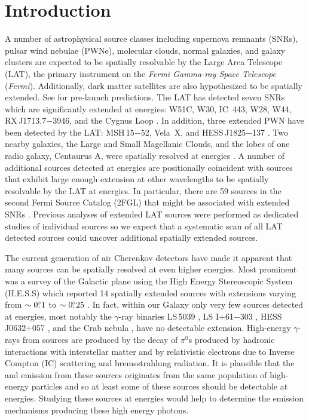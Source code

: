 \documentclass[12pt,preprint]{aastex}
\newcommand{\gev}{\text{GeV}\xspace}
\newcommand{\tev}{\text{TeV}\xspace}
\newcommand{\fermi}{\textit{Fermi}\xspace}
\begin{document}
\section{Introduction}

A number of astrophysical source classes including supernova remnants
(SNRs), pulsar wind nebulae (PWNe), molecular clouds, normal galaxies,
and galaxy clusters are expected to be spatially resolvable 
by the Large Area Telescope (LAT), the primary instrument on the {\em \fermi
Gamma-ray Space Telescope} (\fermi).
Additionally, dark matter satellites are also hypothesized to
be spatially extended. See \cite{atwood_fermi} for pre-launch predictions.
The LAT has
detected seven SNRs which are significantly extended
at \gev energies: 
W51C, W30, 
IC~443, W28, W44, RX\,J1713.7$-$3946,
and the Cygnus Loop
\citep{w51c,w30_lat,ic443,w28,w44,rx_j1713_lat,cygnus_loop_lat}. In addition, 
three extended PWN have been detected by the LAT: MSH\,15$-$52, Vela~X, and
HESS\,J1825$-$137 \citep{msh1552,velax,fermi_hess_j1825}. Two
nearby galaxies, the Large and Small Magellanic Clouds, 
and the lobes of one
radio galaxy, Centaurus A, were spatially resolved at \gev energies
\citep{lmc,smc,cen_a_lat}.  A number of additional sources detected
at \gev energies are positionally coincident with sources that exhibit
large enough extension at other wavelengths to be spatially
resolvable by the LAT at \gev energies.
In particular, there are 59 \gev sources in the second Fermi Source Catalog (2FGL)
that might be associated with extended SNRs \citep[2FGL][]{second_cat}.
Previous analyses of extended LAT sources were performed as dedicated
studies of individual sources so we expect that a systematic scan of
all LAT detected sources could uncover additional spatially extended
sources. 

The current generation of air Cherenkov detectors have
made it apparent that many sources can be spatially resolved
at even higher energies.
Most
prominent was a survey of the Galactic plane using the High Energy
Stereoscopic System (H.E.S.S) which reported 14 spatially extended
sources with extensions varying from $\sim0\mbox{$.\!\!^\circ$}1$ to $\sim0\mbox{$.\!\!^\circ$}25$
\citep{hess_plane_survey}.  In fact, within our Galaxy only very few
sources detected at \tev energies, most notably the $\gamma$-ray binaries
LS\,5039 \citep{HESSLS5039}, LS I+61$-$303 \citep{MAGICLSI, VERITASLSI},
HESS\,J0632+057 \citep{HESS0632}, and the Crab nebula \citep{crab_weekes},
have no detectable extension.  High-energy $\gamma$-rays from
\tev sources are produced by the decay of $\pi^0$s produced by hadronic
interactions with interstellar matter and by relativistic electrons
due to Inverse Compton (IC) scattering and bremsstrahlung radiation.  
It is plausible that the \gev and
\tev emission from these sources originates from the same population of
high-energy particles and so at least some of these sources should be
detectable at \gev energies.  Studying 
these \tev sources at \gev energies would help to
determine the emission mechanisms producing these high energy photons.
\end{document}
